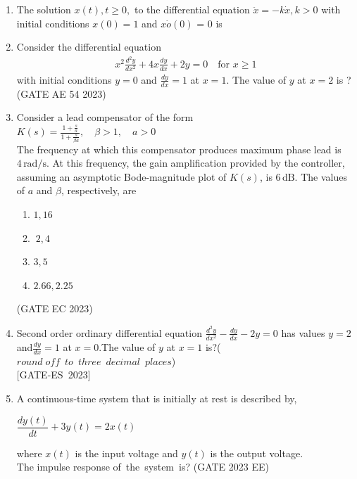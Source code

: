 \begin{enumerate}[label=\thechapter.\arabic*,ref=\thechapter.\theenumi]
\newpage
\item The solution $ x(t) ,t \geq 0, $ to the differential equation
$ \ddot{x} = -k\dot{x}  , k > 0 $ with initial conditions $ x(0) = 1 $ and $ x\dot{o}(0) $ = 0 is\\
\solution
\pagebreak
\item  Consider the differential equation
\begin{align}
x^2\frac{d^2y}{dx^2} + 4x\frac{dy}{dx} + 2y = 0 \quad \text{for } x\geq 1 \nonumber
\end{align}
with initial conditions $y=0$ and $\frac{dy}{dx} = 1$ at
$x = 1$. The value of $y$ at $x = 2$ is ?\\

\hfill(GATE AE 54 2023)\\
\solution

\pagebreak

\item Consider a lead compensator of the form \\
$K(s) = \frac{1 + \frac{s}{a}}{1 + \frac{s}{\beta a}}, \quad \beta > 1, \quad a > 0$\\
The frequency at which this compensator produces maximum phase lead is \(4 \, \text{rad/s}\). At this frequency, the gain amplification provided by the controller, assuming an asymptotic Bode-magnitude plot of \(K(s)\), is \(6 \, \text{dB}\). The values of \(a\) and \(\beta\), respectively, are
\begin{enumerate}
    \item $ 1, 16 $\\
    \item $\ 2, 4 $\\
    \item $ 3, 5 $\\
    \item $ 2.66, 2.25$\\
\end{enumerate}\hfill{(GATE EC 2023)}
\solution
\newpage

\item Second order ordinary differential equation $\frac{d^2y}{dx^2}-\frac{dy}{dx}-2y=0$ has values 
$y=2$ and$\frac{dy}{dx}=1$ at $x=0$.The value of $y$ at $x=1$ is?($round\; off\;\: to\;\: three\;\: decimal\;\: places$)
 \\ \hfill[GATE-ES 2023]\\
 \solution
  
 \newpage

 \item A continuous-time system that is initially at rest is described by,	
	\begin{center}
		$\dfrac{dy(t)}{dt} + 3y(t) = 2x(t)$
	\end{center}
where $x(t)$ is the input voltage and $y(t)$ is the output voltage.\\ 
The impulse response of the system is?
\hfill(GATE 2023 EE)
\solution
\newpage


\end{enumerate}
